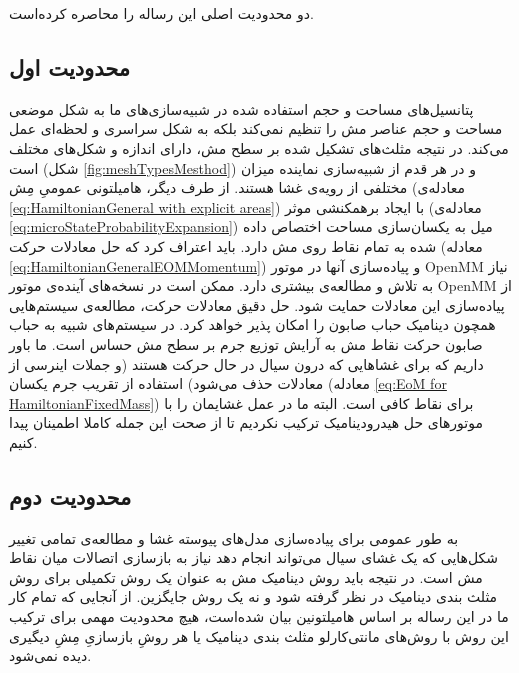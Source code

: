  

دو محدودیت اصلی این رساله را محاصره کرده‌است.
\subsection{
محدودیت اول
}

پتانسیل‌های مساحت و حجم استفاده شده در  شبیه‌سازی‌های ما به شکل موضعی
\cite{Vutukuri2020}
مساحت و حجم عناصر مش را تنظیم نمی‌کند بلکه به شکل سراسری و لحظه‌ای عمل می‌کند. در نتیجه مثلث‌های تشکیل شده بر سطح مش، دارای اندازه و شکل‌‌های مختلف است (شکل
\ref{fig:meshTypesMesthod})
و در هر قدم از شبیه‌سازی نماینده میزان مختلفی از رویه‌ی غشا هستند. از طرف دیگر، هامیلتونی عمومیِ مِش (معادله‌ی
\ref{eq:HamiltonianGeneral with explicit areas})
با ایجاد برهمکنشی موثر (معادله‌ی
\ref{eq:microStateProbabilityExpansion})
میل به یکسان‌سازی مساحت اختصاص داده شده به تمام نقاط روی مش دارد.  باید اعتراف کرد که حل معادلات حرکت (معادله
\ref{eq:HamiltonianGeneralEOMMomentum})
 و پیاده‌سازی آنها در موتور 
OpenMM
نیاز به تلاش و مطالعه‌ی بیشتری دارد. ممکن است در نسخه‌های آینده‌ی موتور
OpenMM
از پیاده‌سازی این معادلات حمایت شود. حل دقیق معادلات حرکت، مطالعه‌ی سیستم‌هایی همچون دینامیک حباب صابون را امکان پذیر خواهد کرد. در سیستم‌های شبیه‌ به حباب صابون حرکت نقاط مش به آرایش توزیع جرم بر سطح مش حساس است. ما باور داریم که برای غشا‌هایی که درون سیال در حال حرکت هستند (و جملات اینرسی از معادلات حذف می‌شود) استفاده از تقریب جرم یکسان (معادله
\ref{eq:EoM for HamiltonianFixedMass})
 برای نقاط کافی است. البته ما در عمل غشایمان را با موتورهای حل هیدرودینامیک
\cite{MPCD2008JCP}
 ترکیب نکردیم تا از صحت این جمله کاملا اطمینان پیدا کنیم.

\subsection{
محدودیت دوم
}


به طور عمومی برای پیاده‌سازی مدل‌های پیوسته غشا و مطالعه‌ی تمامی تغییر شکل‌هایی که یک غشای سیال می‌تواند انجام دهد نیاز به بازسازی اتصالات میان نقاط مش است. در نتیجه باید روش دینامیک مش به عنوان یک روش تکمیلی برای روش مثلث بندی دینامیک در نظر گرفته شود و نه یک روش جایگزین. از آنجایی که تمام کار ما در این رساله بر اساس هامیلتونین بیان شده‌است، هیچ محدودیت مهمی برای ترکیب این روش با روش‌های مانتی‌کارلو مثلث بندی دینامیک یا هر روشِ بازسازیِ مِشِ دیگیری دیده نمی‌شود.


